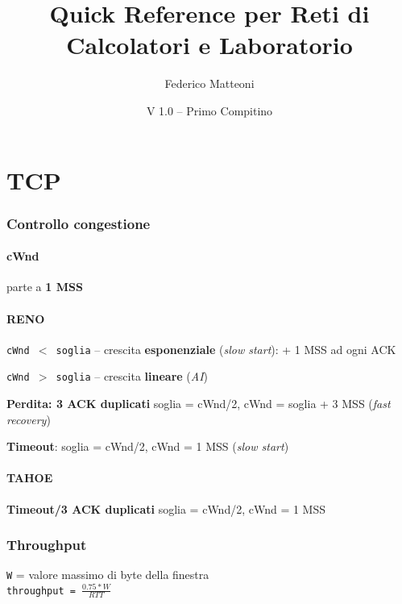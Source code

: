 \documentclass[12pt]{article}
\begin{document}
\title{Quick Reference per Reti di Calcolatori e Laboratorio}
\author{Federico Matteoni}
\date{V 1.0 -- Primo Compitino}
\renewcommand*\contentsname{Indice}

\maketitle

\section{TCP}
\subsubsection{Controllo congestione}
\paragraph{cWnd} parte a \textbf{1 MSS}
\paragraph{RENO} \begin{list}{-}{}
\item \texttt{cWnd $<$ soglia} -- crescita \textbf{esponenziale} (\textit{slow start}): + 1 MSS ad ogni ACK
\item \texttt{cWnd $>$ soglia} -- crescita \textbf{lineare} (\textit{AI})
\item \textbf{Perdita: 3 ACK duplicati} soglia = cWnd/2, cWnd = soglia + 3 MSS (\textit{fast recovery})
\item \textbf{Timeout}: soglia = cWnd/2, cWnd = 1 MSS (\textit{slow start})
\end{list}
\paragraph{TAHOE} \begin{list}{-}{}
\item \textbf{Timeout/3 ACK duplicati} soglia = cWnd/2, cWnd = 1 MSS
\end{list}
\subsubsection{Throughput}
\texttt{W} = valore massimo di byte della finestra\\
\texttt{throughput = $\frac{0.75 * W}{RTT}$}
\end{document}
